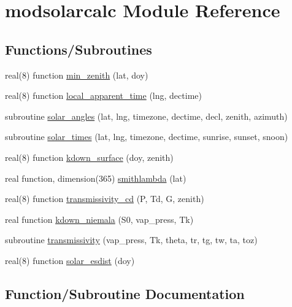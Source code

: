 \hypertarget{namespacemodsolarcalc}{}\section{modsolarcalc Module Reference}
\label{namespacemodsolarcalc}
\subsection*{Functions/\+Subroutines}
\begin{DoxyCompactItemize}
\item 
real(8) function \hyperlink{namespacemodsolarcalc_adfed66792e245bded2293250a0436520}{min\+\_\+zenith} (lat, doy)
\item 
real(8) function \hyperlink{namespacemodsolarcalc_a9ea53ee8fa5b7be8f0e7d919cc846182}{local\+\_\+apparent\+\_\+time} (lng, dectime)
\item 
subroutine \hyperlink{namespacemodsolarcalc_a6f49f02608586154b6a3b3cddcd6aa5e}{solar\+\_\+angles} (lat, lng, timezone, dectime, decl, zenith, azimuth)
\item 
subroutine \hyperlink{namespacemodsolarcalc_a2fbd1d33b3bd03fd930a2a3d93b83599}{solar\+\_\+times} (lat, lng, timezone, dectime, sunrise, sunset, snoon)
\item 
real(8) function \hyperlink{namespacemodsolarcalc_af8c3c752c506d880efae84070a189a71}{kdown\+\_\+surface} (doy, zenith)
\item 
real function, dimension(365) \hyperlink{namespacemodsolarcalc_abf0aac3f480ad1b6dbfdac598c453fa5}{smithlambda} (lat)
\item 
real(8) function \hyperlink{namespacemodsolarcalc_ad567772df0c379c013b1bec090be214a}{transmissivity\+\_\+cd} (P, Td, G, zenith)
\item 
real function \hyperlink{namespacemodsolarcalc_aaddec454c9882fef35b57ee1fa6206b2}{kdown\+\_\+niemala} (S0, vap\+\_\+press, Tk)
\item 
subroutine \hyperlink{namespacemodsolarcalc_a8e5e61f1a3537693aa4ca5527f74233e}{transmissivity} (vap\+\_\+press, Tk, theta, tr, tg, tw, ta, toz)
\item 
real(8) function \hyperlink{namespacemodsolarcalc_a17e233516e1b3514fd9d46a9ebe44e5e}{solar\+\_\+esdist} (doy)
\end{DoxyCompactItemize}


\subsection{Function/\+Subroutine Documentation}
\mbox{\label{namespacemodsolarcalc_aaddec454c9882fef35b57ee1fa6206b2}} 
